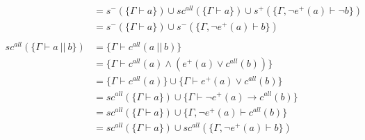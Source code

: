 \documentclass[12pt]{article}
\newcommand{\dbar}{~||~}
\begin{document}
\begin{align*}
                                         & = s^- (\{\Gamma \vdash a\}) \cup sc^{all} (\{\Gamma \vdash a\}) \cup s^+ (\{\Gamma, \neg e^+ (a) \vdash \neg b\})              \\
                                         & = s^- (\{\Gamma \vdash a\}) \cup s^- (\{\Gamma, \neg e^+ (a) \vdash b\})                                                       \\
  \\
  sc^{all} (\{\Gamma \vdash a \dbar b\}) & = \{\Gamma \vdash c^{all} (a \dbar b)\}                                                                                        \\
                                         & = \{\Gamma \vdash c^{all} (a) \land (e^+ (a) \lor c^{all} (b))\}                                                               \\
                                         & = \{\Gamma \vdash c^{all} (a)\} \cup \{\Gamma \vdash e^+ (a) \lor c^{all} (b)\}                                                \\
                                         & = sc^{all}(\{\Gamma \vdash a\}) \cup \{\Gamma \vdash \neg e^+ (a) \rightarrow c^{all} (b)\}                                    \\
                                         & = sc^{all}(\{\Gamma \vdash a\}) \cup \{\Gamma, \neg e^+ (a) \vdash c^{all} (b)\}                                               \\
                                         & = sc^{all}(\{\Gamma \vdash a\}) \cup sc^{all}(\{\Gamma, \neg e^+ (a) \vdash b\})                                               \\
\end{align*}
\end{document}
